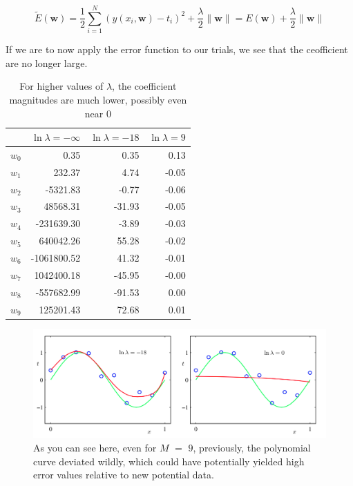 \documentclass{tufte-handout}
\begin{document}
\begin{equation}
  \widetilde{E}(\mathbf{w}) =
    \frac{1}{2}\sum\limits_{i = 1}^N(y(x_i, \mathbf{w}) - t_i)^2
      + \frac{\lambda}{2}\|\mathbf{w}\|
    = E(\mathbf{w}) + \frac{\lambda}{2}\|\mathbf{w}\|
\end{equation}

If we are to now apply the error function to our trials, we see that the
ceofficient are no longer large.

\begin{table}[h]
  \begin{center}
    \begin{tabular}{lrrr}
      \toprule
       & $\ln\lambda = -\infty$ & $\ln\lambda = -18$ & $\ln\lambda = 9$ \\
      \midrule
      $w_0$ &        0.35 &   0.35 &  0.13 \\
      $w_1$ &      232.37 &   4.74 & -0.05 \\
      $w_2$ &    -5321.83 &  -0.77 & -0.06 \\
      $w_3$ &    48568.31 & -31.93 & -0.05 \\
      $w_4$ &  -231639.30 &  -3.89 & -0.03 \\
      $w_5$ &   640042.26 &  55.28 & -0.02 \\
      $w_6$ & -1061800.52 &  41.32 & -0.01 \\
      $w_7$ &  1042400.18 & -45.95 & -0.00 \\
      $w_8$ &  -557682.99 & -91.53 &  0.00 \\
      $w_9$ &   125201.43 &  72.68 &  0.01 \\
      \bottomrule
    \end{tabular}
  \end{center}
  \caption{For higher values of $\lambda$, the coefficient magnitudes are much
    lower, possibly even near $0$}
  \label{tab:font-sizes}
\end{table}

\begin{figure}[h] \label{}
  \includegraphics[width=\linewidth]{lambda.png}
  \caption{As you can see here, even for $M$ $=$ $9$,
  previously, the polynomial curve deviated wildly, which could have
  potentially yielded high error values relative to new potential data.}
\end{figure}
\end{document}
